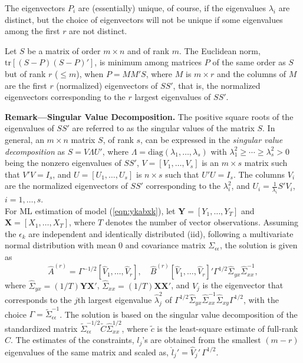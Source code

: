 The eigenvectors $P_i$ are (essentially) unique, of course, if the eigenvalues $\lambda_i$ are distinct, but the choice of eigenvectors will not be unique if some eigenvalues among the first $r$ are not distinct. \\


\begin{result} \label{res:3} 
Let $S$ be a matrix of order $m \times n$ and of rank $m$. The Euclidean norm, $\text{tr}[(S-P)(S-P)']$, is minimum among matrices $P$ of the same order  as $S$ but of rank $r$ ($\leq m$), when $P=MM'S$, where $M$ is $m \times r$ and the columns of $M$ are the first $r$ (normalized) eigenvectors of $SS'$, that is, the normalized eigenvectors corresponding to the $r$ largest eigenvalues of $SS'$. 
\end{result}


\noindent \textbf{Remark---Singular Value Decomposition.} The positive square roots of the eigenvalues of $SS'$ are referred to as the singular values of the matrix $S$. In general, an $m \times n$ matrix $S$, of rank $s$, can be expressed in the \emph{singular value decomposition} as $S=V \Lambda U'$, where $\Lambda=\text{diag}(\lambda_1,\ldots,\lambda_s)$ with $\lambda_1^2 \geq \cdots \geq \lambda_s^2 >0$ being the nonzero eigenvalues of $SS'$, $V=[V_1,\ldots,V_s]$ is an $m \times s$ matrix such that $V'V=I_s$, and $U=[U_1,\ldots,U_s]$ is $n \times s$ such that $U'U=I_s$. The columns $V_i$ are the normalized eigenvectors of $SS'$ corresponding to the $\lambda_i^2$, and $U_i=\frac{1}{\lambda_i}S'V_i$, $i=1,\ldots,s$. \\


For ML estimation of model (\ref{eqn:ykabxk}), let $\mathbf{Y}=[Y_1,\ldots,Y_T]$ and $\mathbf{X}=[X_1,\ldots,X_T]$, where $T$ denotes the number of vector observations. Assuming the $\epsilon_k$ are independent and identically distributed (iid), following a multivariate normal distribution with mean 0 and covariance matrix $\Sigma_{\epsilon\epsilon}$, the solution is given as 
	\begin{equation}\label{eqn:covarmatrixsol}
	\hat{A}^{(r)}=\Gamma^{-1/2}[\hat{V}_1,\ldots,\hat{V}_r], \quad \hat{B}^{(r)}[\hat{V}_1,\ldots,\hat{V}_r]' \Gamma^{1/2} \hat{\Sigma}_{yx} \hat{\Sigma}_{xx}^{-1},
	\end{equation}
where $\hat{\Sigma}_{yx}=(1/T)\mathbf{Y}\mathbf{X}'$, $\hat{\Sigma}_{xx}=(1/T)\mathbf{X}\mathbf{X}'$, and $\hat{V}_j$ is the eigenvector that corresponds to the $j$th largest eigenvalue $\hat{\lambda}_j^2$ of $\Gamma^{1/2}\hat{\Sigma}_{yx} \hat{\Sigma}_{xx}^{-1} \hat{\Sigma}_{xy}\Gamma^{1/2}$, with the choice $\Gamma=\tilde{\Sigma}_{\epsilon\epsilon}^{-1}$. The solution is based on the singular value decomposition of the standardized matrix $\tilde{\Sigma}_{\epsilon\epsilon}^{-1/2} \tilde{C} \hat{\Sigma}_{xx}^{1/2}$, where $\tilde{c}$ is the least-square estimate of full-rank $C$. The estimates of the constraints, $l_j$'s are obtained from the smallest $(m-r)$ eigenvalues of the same matrix and scaled as, $\hat{l}_j'=\hat{V}_j' \, \Gamma^{1/2}$. 


